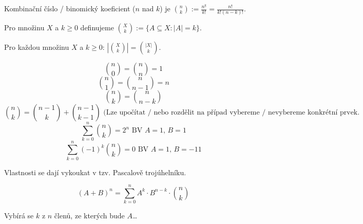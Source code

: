 \documentclass[12pt]{article}					%
\begin{document}
    \begin{definice}
        Kombinační číslo / binomický koeficient ($n$ nad $k$) je $\binom{n}{k} := \frac{n^{\underline{k}}}{k!} = \frac{n!}{k!(n-k)!}$.
    \end{definice}

    \begin{definice}
        Pro množinu $X$ a $k≥0$ definujeme $\binom{X}{k}:= \{A \subseteq X: |A| = k\}$.
    \end{definice}

    \begin{veta}
        Pro každou množinu $X$ a $k≥0$: $\left|\binom{X}{k}\right| = \binom{|X|}{k}$.
    \end{veta}

    \begin{poznamka}
        $$ \binom{n}{0} = \binom{n}{n} = 1 $$ 
        $$ \binom{n}{1} = \binom{n}{n-1} = n $$ 
        $$ \binom{n}{k} = \binom{n}{n-k} $$
        $$ \binom{n}{k} = \binom{n-1}{k} + \binom{n-1}{k-1} \text{ (Lze upočítat / nebo rozdělit na případ vybereme / nevybereme konkrétní prvek.}$$
        $$ \sum_{k=0}^n \binom{n}{k} = 2^n \text{ BV $A=1$, $B=1$} $$ 
        $$ \sum_{k=0}^n (-1)^k \binom{n}{k} = 0 \text{ BV $A=1$, $B=-11$} $$
    \end{poznamka}

    \begin{poznamka}
        Vlastnosti se dají vykoukat v tzv. Pascalově trojúhelníku.
    \end{poznamka}

    \begin{veta}[Binomická]
        $$ (A + B)^n = \sum_{k=0}^n A^k·B^{n-k}·\binom{n}{k} $$

        \begin{dukazin}
            Vybírá se $k$ z $n$ členů, ze kterých bude $A$…
        \end{dukazin}
    \end{veta}

    
\end{document}
